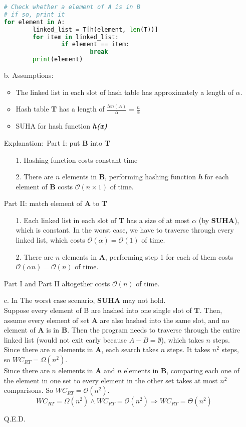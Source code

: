 \documentclass[10pt]{article}
\begin{document}
\begin{enumerate}
\begin{lstlisting}[language=Python]
# Check whether a element of A is in B
# if so, print it
for element in A:
		linked_list = T[h(element, len(T))]
		for item in linked_list:
				if element == item:
						break
		print(element)
\end{lstlisting}
\item[b.]
Assumptions:\
\begin{itemize}
\item The linked list in each slot of hash table has approximately a length of $\alpha$.
\item Hash table \textbf{T} has a length of $\frac{len(A)}{\alpha}=\frac{n}{\alpha}$
\item SUHA for hash function \textbf{\textit{h(x)}}
\end{itemize}
Explanation:\
Part I: put \textbf{B} into \textbf{T}
\begin{enumerate}
\item[1.] Hashing function costs constant time
\item[2.] There are $n$ elements in \textbf{B}, performing hashing function \textbf{\textit{h}} for each element of \textbf{B} costs $\mathcal{O}(n\times1)$ of time.
\end{enumerate}
Part II: match element of \textbf{A} to \textbf{T}
\begin{enumerate}
\item[1.] Each linked list in each slot of \textbf{T} has a size of at most $\alpha$ (by \textbf{SUHA}), which is constant. In the worst case, we have to traverse through every linked list, which costs $\mathcal{O}(\alpha)=\mathcal{O}(1)$ of time.
\item[2.] There are $n$ elements in \textbf{A}, performing step 1 for each of them costs $\mathcal{O}(\alpha n)=\mathcal{O}(n)$ of time.
\end{enumerate}
Part I and Part II altogether costs $\mathcal{O}(n)$ of time.
\item[c.] In The worst case scenario, \textbf{SUHA} may not hold.\\
Suppose every element of B are hashed into one single slot of \textbf{T}. Then, assume every element of set \textbf{A} are also hashed into the same slot, and no element of \textbf{A} is in \textbf{B}. Then the program needs to traverse through the entire linked list (would not exit early because $A-B=\emptyset$), which takes $n$ steps. Since there are $n$ elements in \textbf{A}, each search takes $n$ steps. It takes $n^2$ steps, so $WC_{RT}=\Omega(n^2)$.\\

Since there are $n$ elements in \textbf{A} and $n$ elements in \textbf{B}, comparing each one of the element in one set to every element in the other set takes at most $n^2$ comparisons. So $WC_{RT}=\mathcal{O}(n^2)$.
$$WC_{RT}=\Omega(n^2)\wedge WC_{RT}=\mathcal{O}(n^2)\Rightarrow WC_{RT}=\Theta(n^2)$$
\begin{flushright}
Q.E.D.
\end{flushright}
\end{enumerate}
\end{document}
